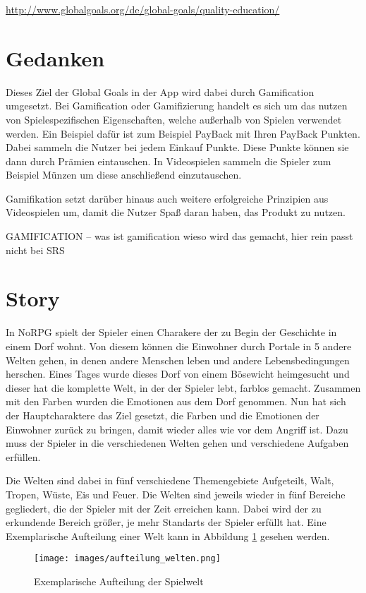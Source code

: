 	\url{http://www.globalgoals.org/de/global-goals/quality-education/}

	
\section{Gedanken}

Dieses Ziel der Global Goals in der App wird dabei durch Gamification umgesetzt. Bei Gamification oder Gamifizierung handelt es sich um das nutzen von Spielespezifischen Eigenschaften, welche außerhalb von Spielen verwendet werden. Ein Beispiel dafür ist zum Beispiel PayBack mit Ihren PayBack Punkten. Dabei sammeln die Nutzer bei jedem Einkauf Punkte. Diese Punkte können sie dann durch Prämien eintauschen. In Videospielen sammeln die Spieler zum Beispiel Münzen um diese anschließend einzutauschen. 

Gamifikation setzt darüber hinaus auch weitere erfolgreiche Prinzipien aus Videospielen um, damit die Nutzer Spaß daran haben, das Produkt zu nutzen.

	GAMIFICATION -- was ist gamification wieso wird das gemacht, hier rein passt nicht bei SRS
	
\section{Story}

In NoRPG spielt der Spieler einen Charakere der zu Begin der Geschichte in einem Dorf wohnt. Von diesem können die Einwohner durch Portale in 5 andere Welten gehen, in denen andere Menschen leben und andere Lebensbedingungen herschen. Eines Tages wurde dieses Dorf von einem Bösewicht heimgesucht und dieser hat die komplette Welt, in der der Spieler lebt, farblos gemacht. Zusammen mit den Farben wurden die Emotionen aus dem Dorf genommen. Nun hat sich der Hauptcharaktere das Ziel gesetzt, die Farben und die Emotionen der Einwohner zurück zu bringen, damit wieder alles wie vor dem Angriff ist. Dazu muss der Spieler in die verschiedenen Welten gehen und verschiedene Aufgaben erfüllen.

Die Welten sind dabei in fünf verschiedene Themengebiete Aufgeteilt, Walt, Tropen, Wüste, Eis und Feuer.
Die Welten sind jeweils wieder in fünf Bereiche gegliedert, die der Spieler mit der Zeit erreichen kann. Dabei wird der zu erkundende Bereich größer, je mehr Standarts der Spieler erfüllt hat. Eine Exemplarische Aufteilung einer Welt kann in Abbildung \ref{aufteilung_welten} gesehen werden.

\begin{figure}[htbp]
\centering 
\label{aufteilung_welten}
\texttt{[image: images/aufteilung\_welten.png]}
\caption{Exemplarische Aufteilung der Spielwelt}
\end{figure}

